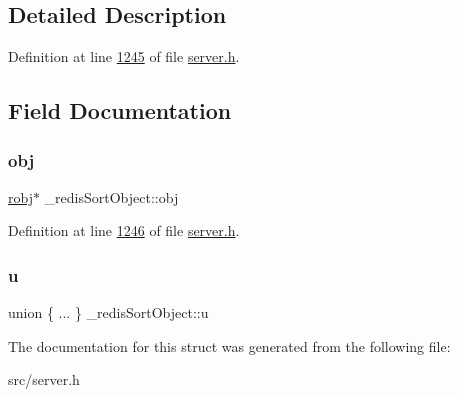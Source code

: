 \subsection{Detailed Description}


Definition at line \hyperlink{server_8h_source_l01245}{1245} of file \hyperlink{server_8h_source}{server.\+h}.



\subsection{Field Documentation}
\mbox{\label{struct__redisSortObject_a4537823adb41ac7cc390fc3e6ef20969}} 
\subsubsection{\texorpdfstring{obj}{obj}}
{\footnotesize\ttfamily \hyperlink{structredisObject}{robj}$\ast$ \+\_\+redis\+Sort\+Object\+::obj}



Definition at line \hyperlink{server_8h_source_l01246}{1246} of file \hyperlink{server_8h_source}{server.\+h}.

\mbox{\label{struct__redisSortObject_ac8b897d5e08a1b3a0257d4ebec6f3146}} 
\subsubsection{\texorpdfstring{u}{u}}
{\footnotesize\ttfamily union \{ ... \}   \+\_\+redis\+Sort\+Object\+::u}



The documentation for this struct was generated from the following file\+:\begin{DoxyCompactItemize}
\item 
src/server.\+h\end{DoxyCompactItemize}
